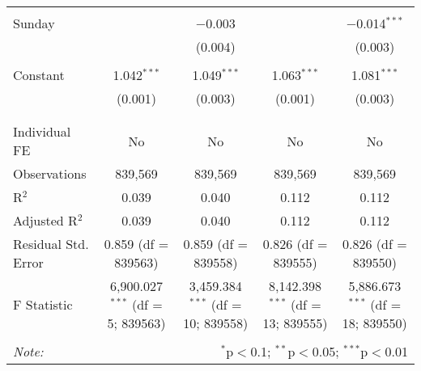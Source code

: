 \documentclass[
]{article}
\begin{document}
\begin{table}[!htbp]
{\begin{tabular}{@{\extracolsep{5pt}}lcccc}
  & & & & \\ 
 Sunday &  & $-$0.003 &  & $-$0.014$^{***}$ \\ 
  &  & (0.004) &  & (0.003) \\ 
  & & & & \\ 
 Constant & 1.042$^{***}$ & 1.049$^{***}$ & 1.063$^{***}$ & 1.081$^{***}$ \\ 
  & (0.001) & (0.003) & (0.001) & (0.003) \\ 
  & & & & \\ 
\hline \\[-1.8ex] 
Individual FE & No & No & No & No \\ 
Observations & 839,569 & 839,569 & 839,569 & 839,569 \\ 
R$^{2}$ & 0.039 & 0.040 & 0.112 & 0.112 \\ 
Adjusted R$^{2}$ & 0.039 & 0.040 & 0.112 & 0.112 \\ 
Residual Std. Error & 0.859 (df = 839563) & 0.859 (df = 839558) & 0.826 (df = 839555) & 0.826 (df = 839550) \\ 
F Statistic & 6,900.027$^{***}$ (df = 5; 839563) & 3,459.384$^{***}$ (df = 10; 839558) & 8,142.398$^{***}$ (df = 13; 839555) & 5,886.673$^{***}$ (df = 18; 839550) \\ 
\hline 
\hline \\[-1.8ex] 
\textit{Note:}  & \multicolumn{4}{r}{$^{*}$p$<$0.1; $^{**}$p$<$0.05; $^{***}$p$<$0.01} \\ 
\end{tabular}
} 
\end{table} 
\newpage
\end{document}
